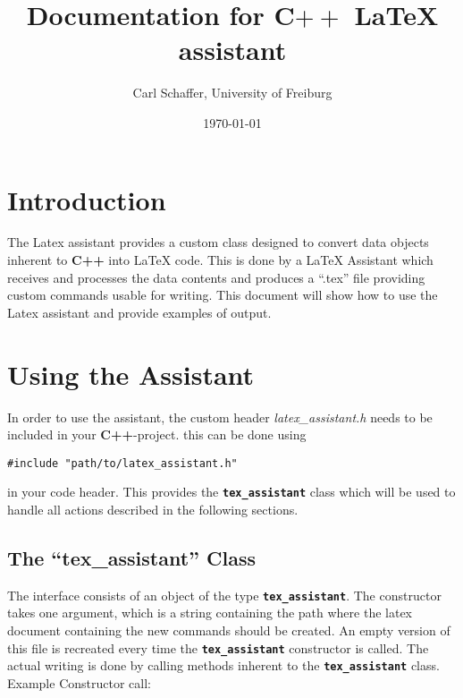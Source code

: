 \documentclass[10pt,a4paper]{article}
\title{Documentation for C${++}$ \LaTeX{} assistant}
\date{\today{}}
\author{Carl Schaffer, University of Freiburg}
\begin{document}
      \maketitle
\newpage{}

\setlength{\parindent}{0pt}

\newcommand{\stdv}{\texttt{std::vector} }
\newcommand{\la}{LaTeX Assistant}
\newcommand{\ta}{\texttt{\textbf{tex\_assistant}}}
\newcommand{\filename}[1]{\textit{#1}}
\newcommand{\cpp}{\textbf{C++}}

\newcommand{\singleValCmd}{\cmdstyle{.ncmdValue()}}
\newcommand{\arrayCmd}{\cmdstyle{.ncmdArray()}}
\newcommand{\cmdstyle}[1]{\textbf{\texttt{#1}}}

\newcommand{\headerfile}{\filename{latex\_assistant.h}}
\newcommand{\texfile}{\enquote{.tex} file}


\section{Introduction}

The Latex assistant provides a custom class designed to convert data
objects inherent to \cpp{} into \LaTeX{} code. This is done by
a \la{} which receives and processes the data contents and produces
a \enquote{.tex}  file providing custom commands usable for writing. This document will show how to use the Latex assistant and provide
examples of output.


\section{Using the Assistant}
In order to use the assistant, the custom header
\headerfile{} needs to be included in your
\cpp{}-project. this can be done using 
\begin{verbatim}
#include "path/to/latex_assistant.h"
\end{verbatim}
in your code header. This provides the \ta{} class which will be used
to handle all actions described in the following sections. 
\subsection{The \enquote{tex\_assistant} Class}

The interface consists of an object of the type \ta{}. The constructor
takes one argument, which is a string containing the path where the latex document
containing the new commands should be created. An empty version of this file is recreated
every time the \ta{} constructor is called. The actual writing is done
by calling methods inherent to the \ta{} class. Example Constructor
call:
\end{document}
